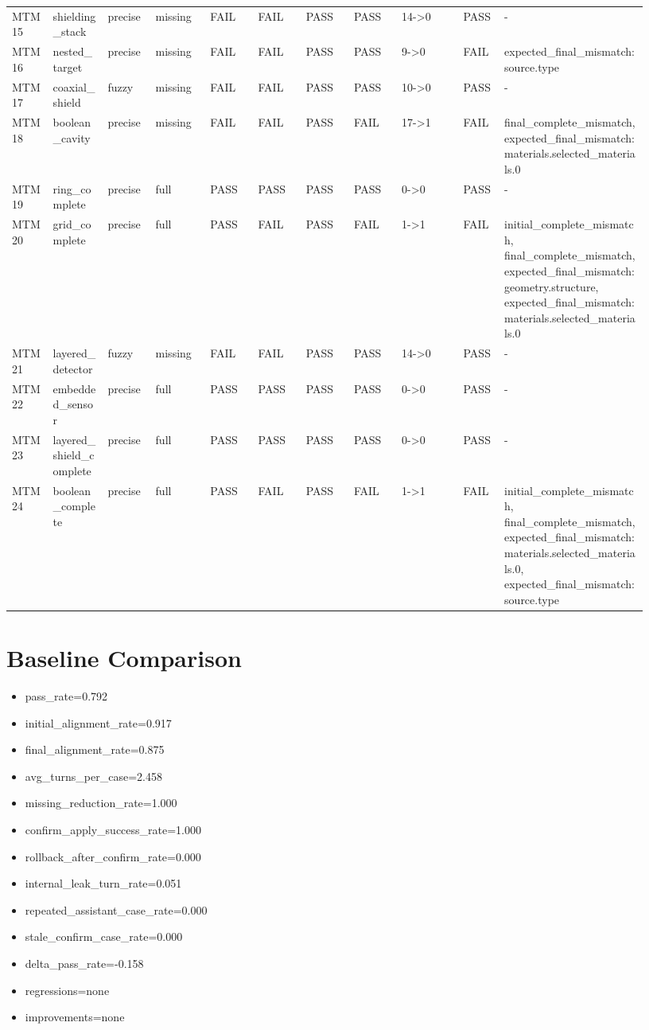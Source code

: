 \documentclass[11pt]{ctexart}
\begin{document}
\begin{longtable}{p{0.06\linewidth}p{0.08\linewidth}p{0.07\linewidth}p{0.08\linewidth}p{0.07\linewidth}p{0.07\linewidth}p{0.07\linewidth}p{0.07\linewidth}p{0.09\linewidth}p{0.06\linewidth}p{0.21\linewidth}}
MTM15 & shielding\_stack & precise & missing & FAIL & FAIL & PASS & PASS & 14->0 & PASS & - \\
MTM16 & nested\_target & precise & missing & FAIL & FAIL & PASS & PASS & 9->0 & FAIL & expected\_final\_mismatch:source.type \\
MTM17 & coaxial\_shield & fuzzy & missing & FAIL & FAIL & PASS & PASS & 10->0 & PASS & - \\
MTM18 & boolean\_cavity & precise & missing & FAIL & FAIL & PASS & FAIL & 17->1 & FAIL & final\_complete\_mismatch, expected\_final\_mismatch:materials.selected\_materials.0 \\
MTM19 & ring\_complete & precise & full & PASS & PASS & PASS & PASS & 0->0 & PASS & - \\
MTM20 & grid\_complete & precise & full & PASS & FAIL & PASS & FAIL & 1->1 & FAIL & initial\_complete\_mismatch, final\_complete\_mismatch, expected\_final\_mismatch:geometry.structure, expected\_final\_mismatch:materials.selected\_materials.0 \\
MTM21 & layered\_detector & fuzzy & missing & FAIL & FAIL & PASS & PASS & 14->0 & PASS & - \\
MTM22 & embedded\_sensor & precise & full & PASS & PASS & PASS & PASS & 0->0 & PASS & - \\
MTM23 & layered\_shield\_complete & precise & full & PASS & PASS & PASS & PASS & 0->0 & PASS & - \\
MTM24 & boolean\_complete & precise & full & PASS & FAIL & PASS & FAIL & 1->1 & FAIL & initial\_complete\_mismatch, final\_complete\_mismatch, expected\_final\_mismatch:materials.selected\_materials.0, expected\_final\_mismatch:source.type \\
\bottomrule
\end{longtable}
\section{Baseline Comparison}
\begin{itemize}
\item pass\_rate=0.792
\item initial\_alignment\_rate=0.917
\item final\_alignment\_rate=0.875
\item avg\_turns\_per\_case=2.458
\item missing\_reduction\_rate=1.000
\item confirm\_apply\_success\_rate=1.000
\item rollback\_after\_confirm\_rate=0.000
\item internal\_leak\_turn\_rate=0.051
\item repeated\_assistant\_case\_rate=0.000
\item stale\_confirm\_case\_rate=0.000
\item delta\_pass\_rate=-0.158
\item regressions=none
\item improvements=none
\end{itemize}
\appendix
\end{document}
